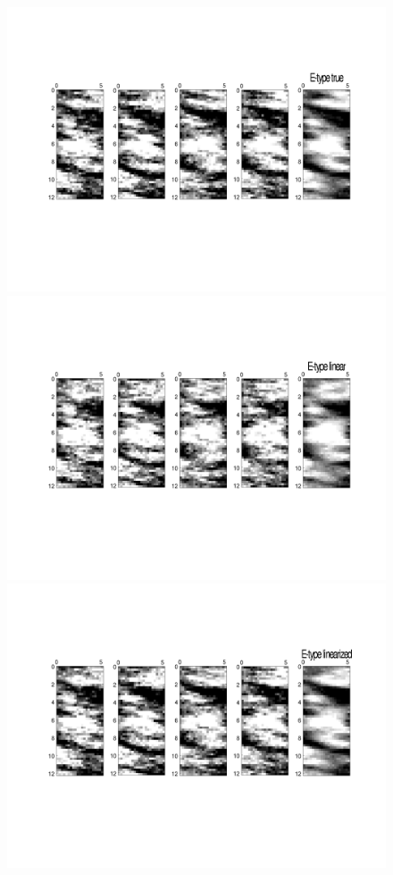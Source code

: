 \documentclass[12t]{article}
\begin{document}
\begin{figure}
\centering
  \includegraphics[width=14cm]{sim_true}
  \includegraphics[width=14cm]{sim_lin}
  \includegraphics[width=14cm]{sim_iterative}
\caption[5 samples of the a posterior pdf using top) the true kernel, b) the constant velocity kernel, c) the linearized kernel.]{}
\label{fig:iterative_sim}
\end{figure}
\end{document}
